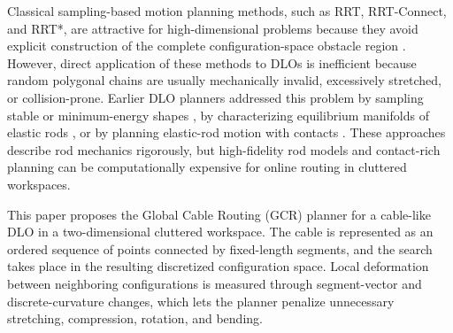 \documentclass{pas}
\begin{document}
Classical sampling-based motion planning methods, such as RRT, RRT-Connect, and RRT*, are attractive for high-dimensional problems because they avoid explicit construction of the complete configuration-space obstacle region \citep{KuffnerLaValle2000RRTConnect,KaramanFrazzoli2011SamplingOptimal}. However, direct application of these methods to DLOs is inefficient because random polygonal chains are usually mechanically invalid, excessively stretched, or collision-prone. Earlier DLO planners addressed this problem by sampling stable or minimum-energy shapes \citep{MollKavraki2006DLOPlanning}, by characterizing equilibrium manifolds of elastic rods \citep{BretlMcCarthy2014ElasticRod}, or by planning elastic-rod motion with contacts \citep{RousselFernbachTaix2020ElasticRodContacts}. These approaches describe rod mechanics rigorously, but high-fidelity rod models and contact-rich planning can be computationally expensive for online routing in cluttered workspaces.

This paper proposes the Global Cable Routing (GCR) planner for a cable-like DLO in a two-dimensional cluttered workspace. The cable is represented as an ordered sequence of points connected by fixed-length segments, and the search takes place in the resulting discretized configuration space. Local deformation between neighboring configurations is measured through segment-vector and discrete-curvature changes, which lets the planner penalize unnecessary stretching, compression, rotation, and bending.
\end{document}
